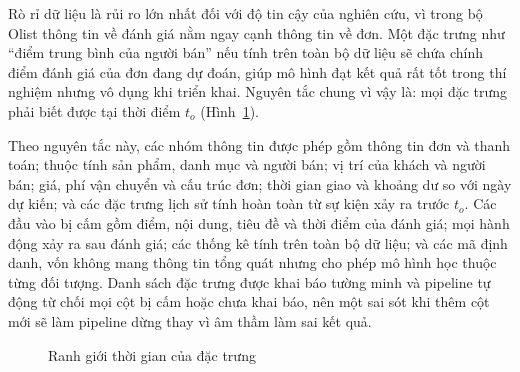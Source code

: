 \documentclass[12pt,a4paper]{report}
\begin{document}
Rò rỉ dữ liệu là rủi ro lớn nhất đối với độ tin cậy của nghiên cứu, vì trong bộ Olist thông tin về đánh giá nằm ngay cạnh thông tin về đơn. Một đặc trưng như ``điểm trung bình của người bán'' nếu tính trên toàn bộ dữ liệu sẽ chứa chính điểm đánh giá của đơn đang dự đoán, giúp mô hình đạt kết quả rất tốt trong thí nghiệm nhưng vô dụng khi triển khai. Nguyên tắc chung vì vậy là: mọi đặc trưng phải biết được tại thời điểm $t_o$ (Hình~\ref{fig:leakage-timeline}).

Theo nguyên tắc này, các nhóm thông tin được phép gồm thông tin đơn và thanh toán; thuộc tính sản phẩm, danh mục và người bán; vị trí của khách và người bán; giá, phí vận chuyển và cấu trúc đơn; thời gian giao và khoảng dư so với ngày dự kiến; và các đặc trưng lịch sử tính hoàn toàn từ sự kiện xảy ra trước $t_o$. Các đầu vào bị cấm gồm điểm, nội dung, tiêu đề và thời điểm của đánh giá; mọi hành động xảy ra sau đánh giá; các thống kê tính trên toàn bộ dữ liệu; và các mã định danh, vốn không mang thông tin tổng quát nhưng cho phép mô hình học thuộc từng đối tượng. Danh sách đặc trưng được khai báo tường minh và pipeline tự động từ chối mọi cột bị cấm hoặc chưa khai báo, nên một sai sót khi thêm cột mới sẽ làm pipeline dừng thay vì âm thầm làm sai kết quả.

\begin{figure}[htbp]\centering
{}
\caption{Ranh giới thời gian của đặc trưng}
\label{fig:leakage-timeline}
\end{figure}
\end{document}
